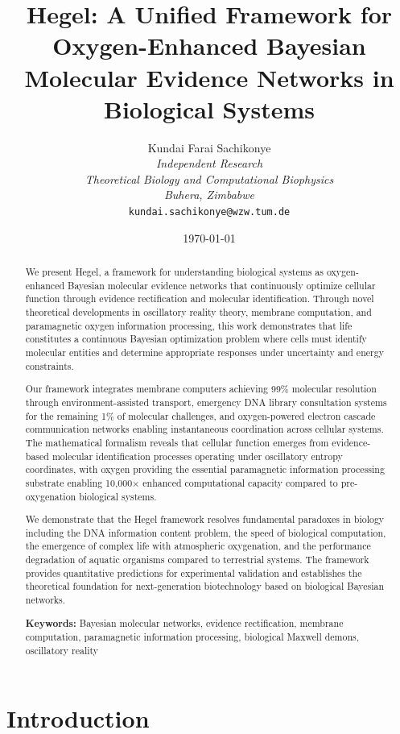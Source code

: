 \documentclass[12pt,a4paper]{article}
\title{\textbf{Hegel: A Unified Framework for Oxygen-Enhanced Bayesian Molecular Evidence Networks in Biological Systems}}
\author{
Kundai Farai Sachikonye\\
\textit{Independent Research}\\
\textit{Theoretical Biology and Computational Biophysics}\\
\textit{Buhera, Zimbabwe}\\
\texttt{kundai.sachikonye@wzw.tum.de}
}
\date{\today}
\begin{document}
\maketitle

\begin{abstract}
We present Hegel, a framework for understanding biological systems as oxygen-enhanced Bayesian molecular evidence networks that continuously optimize cellular function through evidence rectification and molecular identification. Through novel theoretical developments in oscillatory reality theory, membrane computation, and paramagnetic oxygen information processing, this work demonstrates that life constitutes a continuous Bayesian optimization problem where cells must identify molecular entities and determine appropriate responses under uncertainty and energy constraints.

Our framework integrates membrane computers achieving 99\% molecular resolution through environment-assisted transport, emergency DNA library consultation systems for the remaining 1\% of molecular challenges, and oxygen-powered electron cascade communication networks enabling instantaneous coordination across cellular systems. The mathematical formalism reveals that cellular function emerges from evidence-based molecular identification processes operating under oscillatory entropy coordinates, with oxygen providing the essential paramagnetic information processing substrate enabling 10,000× enhanced computational capacity compared to pre-oxygenation biological systems.

We demonstrate that the Hegel framework resolves fundamental paradoxes in biology including the DNA information content problem, the speed of biological computation, the emergence of complex life with atmospheric oxygenation, and the performance degradation of aquatic organisms compared to terrestrial systems. The framework provides quantitative predictions for experimental validation and establishes the theoretical foundation for next-generation biotechnology based on biological Bayesian networks.

\textbf{Keywords:} Bayesian molecular networks, evidence rectification, membrane computation, paramagnetic information processing, biological Maxwell demons, oscillatory reality
\end{abstract}

\section{Introduction}
\end{document}
